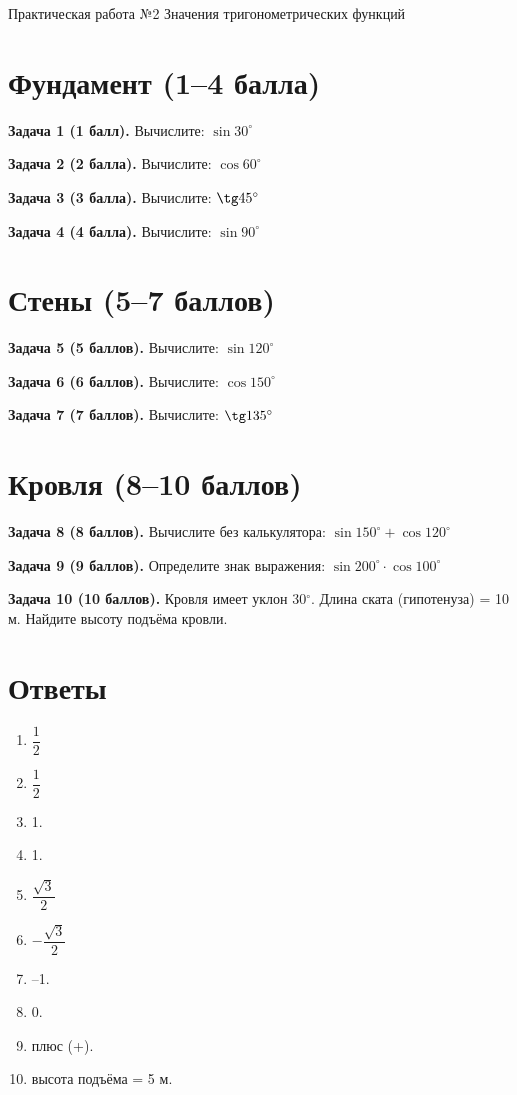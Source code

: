 \documentclass{umk-matematika}
\begin{document}
\maketitlepage
    {Практическая работа №2}
    {Значения тригонометрических функций}
    {}

\section{Фундамент (1--4 балла)}

\textbf{Задача 1 (1 балл).} Вычислите: $\sin 30^\circ$

\textbf{Задача 2 (2 балла).} Вычислите: $\cos 60^\circ$

\textbf{Задача 3 (3 балла).} Вычислите: $\tg 45^\circ$

\textbf{Задача 4 (4 балла).} Вычислите: $\sin 90^\circ$

\section{Стены (5--7 баллов)}

\textbf{Задача 5 (5 баллов).} Вычислите: $\sin 120^\circ$

\textbf{Задача 6 (6 баллов).} Вычислите: $\cos 150^\circ$

\textbf{Задача 7 (7 баллов).} Вычислите: $\tg 135^\circ$

\section{Кровля (8--10 баллов)}

\textbf{Задача 8 (8 баллов).} Вычислите без калькулятора: $\sin 150^\circ + \cos 120^\circ$

\textbf{Задача 9 (9 баллов).} Определите знак выражения: $\sin 200^\circ \cdot \cos 100^\circ$

\textbf{Задача 10 (10 баллов).} Кровля имеет уклон 30$^\circ$. Длина ската (гипотенуза) = 10 м. Найдите высоту подъёма кровли.

\newpage
\section*{Ответы}

\begin{enumerate}
  \item $\dfrac{1}{2}$
  \item $\dfrac{1}{2}$
  \item 1.
  \item 1.
  \item $\dfrac{\sqrt{3}}{2}$
  \item $-\dfrac{\sqrt{3}}{2}$
  \item –1.
  \item 0.
  \item плюс (+).
  \item высота подъёма = 5 м.
\end{enumerate}
\end{document}
